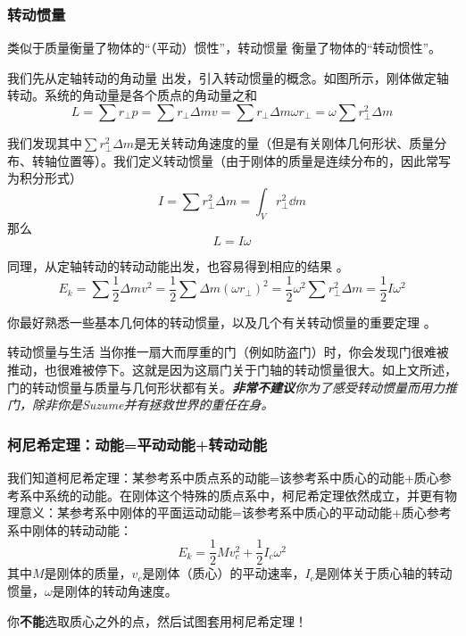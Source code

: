 \subsubsection{转动惯量}
类似于质量衡量了物体的“（平动）惯性”，转动惯量 衡量了物体的“转动惯性”。

我们先从定轴转动的角动量 出发，引入转动惯量的概念。如图所示，刚体做定轴转动。系统的角动量是各个质点的角动量之和
$$L = \sum r_\perp p = \sum r_\perp \Delta m v = \sum r_\perp \Delta m \omega r_\perp = \omega \sum r_\perp^2 \Delta m$$

我们发现其中$\sum r_\perp^2 \Delta m$是无关转动角速度的量（但是有关刚体几何形状、质量分布、转轴位置等）。我们定义转动惯量（由于刚体的质量是连续分布的，因此常写为积分形式）
$$
I =\sum r_\perp^2 \Delta m = \int_V r_\perp^2 \dd m
$$
那么
$$ L = I \omega$$ 

同理，从定轴转动的转动动能出发，也容易得到相应的结果 。
$$E_k = \sum \frac{1}{2} \Delta m v^2 = \frac{1}{2} \sum \Delta m (\omega r_\perp)^2 = \frac{1}{2} \omega^2 \sum r_\perp^2 \Delta m = \frac{1}{2} I \omega^2$$

你最好熟悉一些基本几何体的转动惯量，以及几个有关转动惯量的重要定理 。

\begin{example}{转动惯量与生活}
当你推一扇大而厚重的门（例如防盗门）时，你会发现门很难被推动，也很难被停下。这就是因为这扇门关于门轴的转动惯量很大。如上文所述，门的转动惯量与质量与几何形状都有关。\textsl{\textbf{非常不建议}你为了感受转动惯量而用力推门，除非你是Suzume并有拯救世界的重任在身。}
\end{example}

\subsubsection{柯尼希定理：动能=平动动能+转动动能}
我们知道柯尼希定理：某参考系中质点系的动能=该参考系中质心的动能+质心参考系中系统的动能。在刚体这个特殊的质点系中，柯尼希定理依然成立，并更有物理意义：某参考系中刚体的平面运动动能=该参考系中质心的平动动能+质心参考系中刚体的转动动能：
$$E_k = \frac{1}{2}Mv_c^2 + \frac{1}{2} I_c \omega^2$$
其中$M$是刚体的质量，$v_c$是刚体（质心）的平动速率，$I_c$是刚体关于质心轴的转动惯量，$\omega$是刚体的转动角速度。

你\textbf{不能}选取质心之外的点，然后试图套用柯尼希定理！

